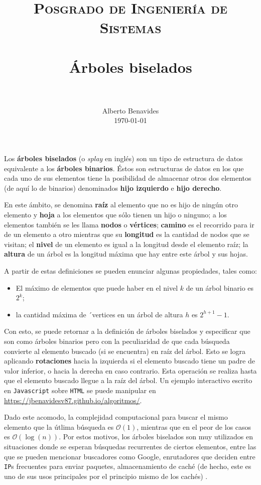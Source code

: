 \documentclass[paper=leter, fontsize=11pt]{scrartcl}
\title{
		\usefont{OT1}{bch}{b}{n}
		\normalfont \normalsize \textsc{Posgrado de Ingeniería de Sistemas} \\ [25pt]
		\horrule{0.5pt} \\[0.4cm]
		\huge Árboles biselados \\
		\horrule{2pt} \\[0.5cm]
}
\author{
		\normalfont 								\normalsize
        Alberto Benavides\\[-3pt]		\normalsize
        \today
}
\date{}
\numberwithin{equation}{section}		%
\numberwithin{figure}{section}			%
\numberwithin{table}{section}				%
\begin{document}
\maketitle

Los \textbf{árboles biselados} (o \textit{splay} en inglés) son un tipo de estructura de datos equivalente a los \textbf{árboles binarios}. Éstos son estructuras de datos en los que cada uno de sus elementos tiene la posibilidad de almacenar otros dos elementos (de aquí lo de binarios) denominados \textbf{hijo izquierdo} e \textbf{hijo derecho}. 

En este ámbito, se denomina \textbf{raíz} al elemento que no es hijo de ningún otro elemento y \textbf{hoja} a los elementos que sólo tienen un hijo o ninguno; a los elementos también se les llama \textbf{nodos} o \textbf{vértices}; \textbf{camino} es el recorrido para ir de un elemento a otro mientras que su \textbf{longitud} es la cantidad de nodos que se visitan; el \textbf{nivel} de un elemento es igual a la longitud desde el elemento raíz; la \textbf{altura} de un árbol es la longitud máxima que hay entre este árbol y sus hojas. \nocite{arboles_binarios}

A partir de estas definiciones se pueden enunciar algunas propiedades, tales como:
\begin{itemize}
    \item El máximo de elementos que puede haber en el nivel $k$ de un árbol binario es $2^{k}$;
    \item la cantidad máxima de ´vertices en un árbol de altura $h$ es $2^{h + 1} - 1$.
\end{itemize}


Con esto, se puede retornar a la definición de árboles biselados y especificar que son como árboles binarios pero con la peculiaridad de que cada búsqueda convierte al elemento buscado (si se encuentra) en raíz del árbol. Esto se logra aplicando \textbf{rotaciones} hacia la izquierda si el elemento buscado tiene un padre de valor inferior, o hacia la derecha en caso contrario. Esta operación se realiza hasta que el elemento buscado llegue a la raíz del árbol. Un ejemplo interactivo escrito en \texttt{Javascript} sobre \texttt{HTML} se puede manipular en \url{https://jbenavidesv87.github.io/algoritmos/}. \nocite{python_slay_trees} \nocite{javascript_slay_trees}

Dado este acomodo, la complejidad computacional para buscar el mismo elemento que la útlima búsqueda es $\mathcal{O}(1)$, mientras que en el peor de los casos es $\mathcal{O}(\log(n))$. Por estos motivos, los árboles biselados son muy utilizados en situaciones donde se esperan búsquedas recurrentes de ciertos elementos, entre las que se pueden mencionar buscadores como Google, enrutadores que deciden entre \texttt{IP}s frecuentes para enviar paquetes, almacenamiento de caché (de hecho, este es uno de sus usos principales por el principio mismo de los cachés) \cite{splay_uses}.



\end{document}
